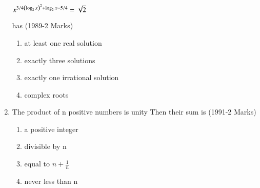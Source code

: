 \documentclass[journal,12pt,twocolumn]{IEEEtran}
\theoremstyle{remark}
\begin{document}
\begin{enumerate}
$x^{3/4\left(\log_{2} x\right)^{2}+\log_{2} x-5/4}=\sqrt{2}$

has \hfill (1989-2 Marks)
\begin{enumerate}
    \item at least one real solution
    \item exactly three solutions
    \item exactly one irrational solution
    \item complex roots
\end{enumerate}
\item The product of n positive numbers is unity Then their sum is \hfill (1991-2 Marks)
\begin{enumerate}
    \item a positive integer
    \item divisible by n
    \item equal to $n+\frac{1}{n}$
    \item never less than n
\end{enumerate}


\end{enumerate}
\end{document}
